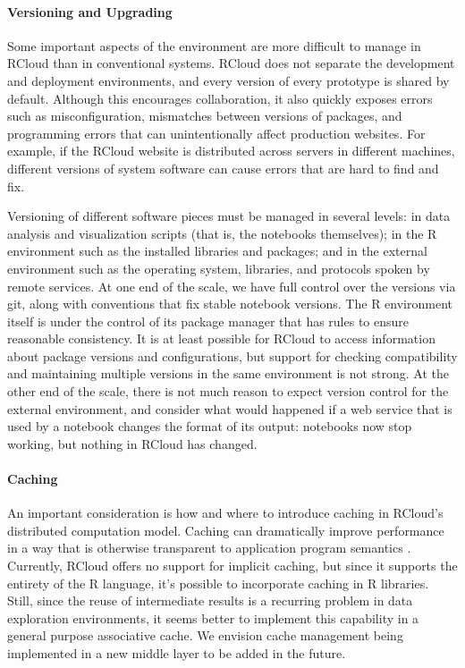 \paragraph*{Versioning and Upgrading}
Some important aspects of the environment are more difficult to manage
in RCloud than in conventional systems. RCloud does not separate the
development and deployment environments, and every version of every
prototype is shared by default. Although this encourages
collaboration, it also quickly exposes errors such as
misconfiguration, mismatches between versions of packages, and
programming errors that can unintentionally affect production
websites. For example, if the RCloud website is distributed across
servers in different machines, different versions of system software
can cause errors that are hard to find and fix.

Versioning of different software pieces must be managed in several
levels: in data analysis and visualization scripts (that is, the
notebooks themselves); in the R environment such as the installed
libraries and packages; and in the external environment such as the
operating system, libraries, and protocols spoken by remote
services. At one end of the scale, we have full control over the
versions via git, along with conventions that fix stable notebook
versions.  The R environment itself is under the control of its
package manager that has rules to ensure reasonable consistency.  It
is at least possible for RCloud to access information about package
versions and configurations, but support for checking compatibility
and maintaining multiple versions in the same environment is not
strong. At the other end of the scale, there is not much reason to
expect version control for the external environment, and consider what
would happened if a web service that is used by a notebook changes the
format of its output: notebooks now stop working, but nothing in
RCloud has changed.


\paragraph*{Caching}
An important consideration is how and where to introduce caching in
RCloud's distributed computation model. Caching can dramatically
improve performance in a way that is otherwise transparent to
application program semantics \cite{Callahan:2006:VVM, Guo:2010:TPI}.
Currently, RCloud offers no support for implicit caching, but since it
supports the entirety of the R language, it's possible to incorporate
caching in R libraries. Still, since the reuse of intermediate
results is a recurring problem in data exploration environments, it
seems better to implement this capability in a general purpose
associative cache. We envision cache management being implemented in a
new middle layer to be added in the future.

